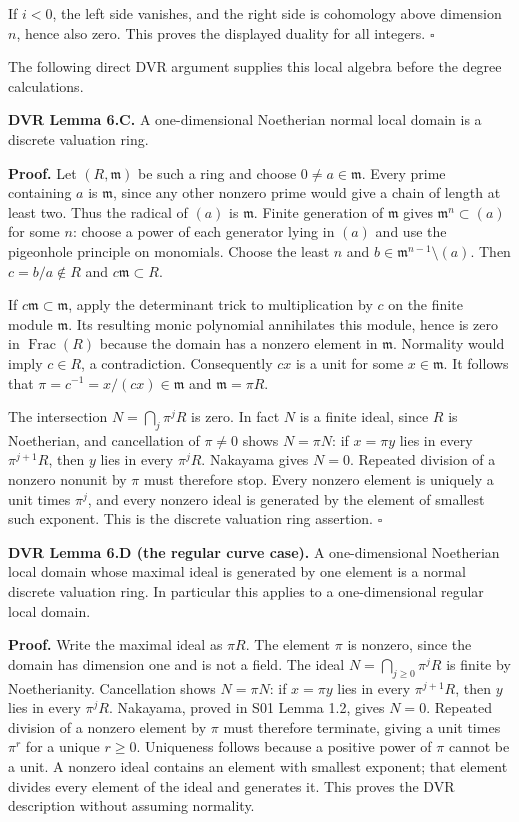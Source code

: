\documentclass[11pt,a4paper,openany]{report}
\begin{document}
If \(i<0\), the left side vanishes, and the right side is cohomology above dimension \(n\), hence also zero. This proves the displayed duality for all integers. \(\square\)

The following direct DVR argument supplies this local algebra before the degree calculations.

\textbf{DVR Lemma 6.C.} A one-dimensional Noetherian normal local domain is a discrete valuation ring.

\textbf{Proof.} Let \((R,\mathfrak m)\) be such a ring and choose \(0\ne a\in\mathfrak m\). Every prime containing \(a\) is \(\mathfrak m\), since any other nonzero prime would give a chain of length at least two. Thus the radical of \((a)\) is \(\mathfrak m\). Finite generation of \(\mathfrak m\) gives \(\mathfrak m^n\subset(a)\) for some \(n\): choose a power of each generator lying in \((a)\) and use the pigeonhole principle on monomials. Choose the least \(n\) and \(b\in\mathfrak m^{n-1}\setminus(a)\). Then \(c=b/a\notin R\) and \(c\mathfrak m\subset R\).

If \(c\mathfrak m\subset\mathfrak m\), apply the determinant trick to multiplication by \(c\) on the finite module \(\mathfrak m\). Its resulting monic polynomial annihilates this module, hence is zero in \(\operatorname{Frac}(R)\) because the domain has a nonzero element in \(\mathfrak m\). Normality would imply \(c\in R\), a contradiction. Consequently \(cx\) is a unit for some \(x\in\mathfrak m\). It follows that \(\pi=c^{-1}=x/(cx)\in\mathfrak m\) and \(\mathfrak m=\pi R\).

The intersection \(N=\bigcap_j\pi^jR\) is zero. In fact \(N\) is a finite ideal, since \(R\) is Noetherian, and cancellation of \(\pi\ne0\) shows \(N=\pi N\): if \(x=\pi y\) lies in every \(\pi^{j+1}R\), then \(y\) lies in every \(\pi^jR\). Nakayama gives \(N=0\). Repeated division of a nonzero nonunit by \(\pi\) must therefore stop. Every nonzero element is uniquely a unit times \(\pi^j\), and every nonzero ideal is generated by the element of smallest such exponent. This is the discrete valuation ring assertion. \(\square\)

\textbf{DVR Lemma 6.D (the regular curve case).} A one-dimensional Noetherian local domain whose maximal ideal is generated by one element is a normal discrete valuation ring. In particular this applies to a one-dimensional regular local domain.

\textbf{Proof.} Write the maximal ideal as \(\pi R\). The element \(\pi\) is nonzero, since the domain has dimension one and is not a field. The ideal \(N=\bigcap_{j\ge0}\pi^jR\) is finite by Noetherianity. Cancellation shows \(N=\pi N\): if \(x=\pi y\) lies in every \(\pi^{j+1}R\), then \(y\) lies in every \(\pi^jR\). Nakayama, proved in S01 Lemma 1.2, gives \(N=0\). Repeated division of a nonzero element by \(\pi\) must therefore terminate, giving a unit times \(\pi^r\) for a unique \(r\ge0\). Uniqueness follows because a positive power of \(\pi\) cannot be a unit. A nonzero ideal contains an element with smallest exponent; that element divides every element of the ideal and generates it. This proves the DVR description without assuming normality.
\end{document}
